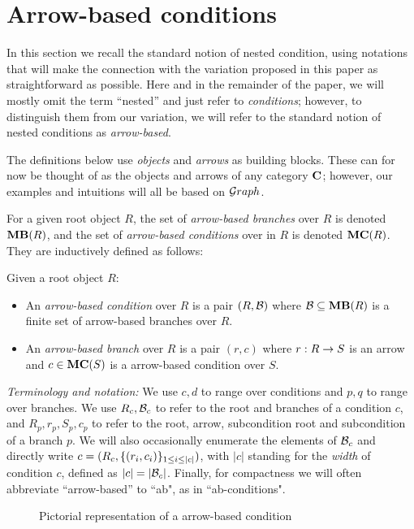 \section{Arrow-based conditions}
 
In this section we recall the standard notion of nested condition, using notations that will make the connection with the variation proposed in this paper as straightforward as possible. Here and in the remainder of the paper, we will mostly omit the term ``nested'' and just refer to \emph{conditions}; however, to distinguish them from our variation, we will refer to the standard notion of nested conditions as \emph{arrow-based}.

The definitions below use \emph{objects} and \emph{arrows} as building blocks. These can for now be thought of as the objects and arrows of any category $\mathbf{C}$; however, our examples and intuitions will all be based on ${\mathcal Graph}$.

For a given root object $R$, the set of \emph{arrow-based branches} over $R$ is denoted $\MB{R}$, and the set of \emph{arrow-based conditions} over in $R$ is denoted $\MC R$. They are inductively defined as follows:

\begin{definition}
  Given a root object $R$:
  \begin{itemize}
  \item An \emph{arrow-based condition} over $R$ is a pair $(R,\mathcal{B})$ where $\cB\subseteq \MB R$ is a finite set of arrow-based branches over $R$.
  \item An \emph{arrow-based branch} over $R$ is a pair $(r,c)$ where $r: R\rightarrow S$ is an arrow and $c\in \MC S$ is a arrow-based condition over $S$.
  \end{itemize}
\end{definition}
%
\emph{Terminology and notation:} We use $c,d$ to range over conditions and $p,q$ to range over branches. We use $R_c,\mathcal{B}_c$ to refer to the root and branches of a condition $c$, and $R_p,r_p,S_p,c_p$ to refer to the root, arrow, subcondition root and subcondition of a branch $p$. We will also occasionally enumerate the elements of $\mathcal{B}_c$ and directly write $c=(R_c, \{{(r_i, c_i)}\}_{1\leq i\leq |c|})$, with $|c|$ standing for the \emph{width} of condition $c$, defined as $|c|=|\mathcal{B}_c|$. Finally, for compactness we will often abbreviate ``arrow-based'' to ``ab", as in ``ab-conditions".
%
\begin{figure}
  \centering
  
  \caption{Pictorial representation of a arrow-based condition}
\end{figure}

